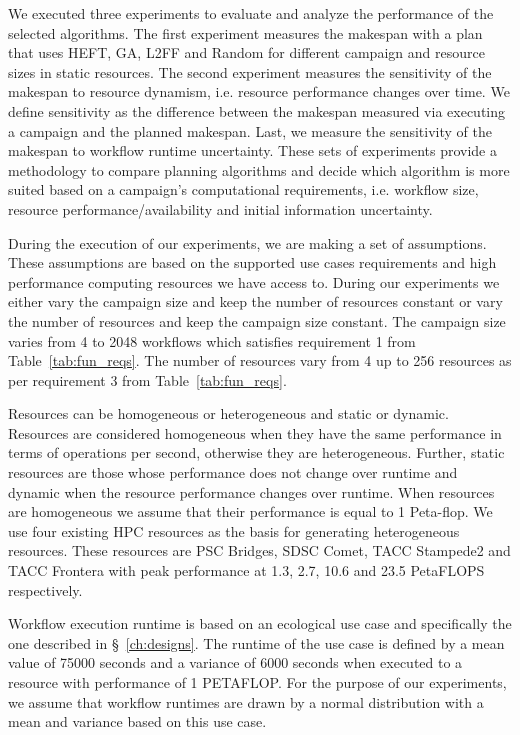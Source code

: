 We executed three experiments to evaluate and analyze the performance of the selected algorithms.
The first experiment measures the makespan with a plan that uses HEFT, GA, L2FF and Random for different campaign and resource sizes in static resources.
The second experiment measures the sensitivity of the makespan to resource dynamism, i.e. resource performance changes over time.
We define sensitivity as the difference between the makespan measured via executing a campaign and the planned makespan.
Last, we measure the sensitivity of the makespan to workflow runtime uncertainty.
These sets of experiments provide a methodology to compare planning algorithms and decide which algorithm is more suited based on a campaign's computational requirements, i.e. workflow size, resource performance/availability and initial information uncertainty.

During the execution of our experiments, we are making a set of assumptions.
These assumptions are based on the supported use cases requirements and high performance computing resources we have access to.
During our experiments we either vary the campaign size and keep the number of resources constant or vary the number of resources and keep the campaign size constant.
The campaign size varies from 4 to 2048 workflows which satisfies requirement 1 from Table~\ref{tab:fun_reqs}.
The number of resources vary from 4 up to 256 resources as per requirement 3 from Table~\ref{tab:fun_reqs}.

Resources can be homogeneous or heterogeneous and static or dynamic.
Resources are considered homogeneous when they have the same performance in terms of operations per second, otherwise they are heterogeneous.
Further, static resources are those whose performance does not change over runtime and dynamic when the resource performance changes over runtime.
When resources are homogeneous we assume that their performance is equal to 1 Peta-flop.
We use four existing HPC resources as the basis for generating heterogeneous resources.
These resources are PSC Bridges, SDSC Comet, TACC Stampede2 and TACC Frontera with peak performance at 1.3, 2.7, 10.6 and 23.5 PetaFLOPS respectively.

Workflow execution runtime is based on an ecological use case and specifically the one described in \S~\ref{ch:designs}.
The runtime of the use case is defined by a mean value of 75000 seconds and a variance of 6000 seconds when executed to a resource with performance of 1 PETAFLOP.
For the purpose of our experiments, we assume that workflow runtimes are drawn by a normal distribution with a mean and variance based on this use case.

